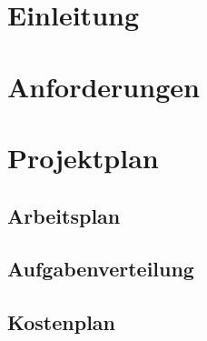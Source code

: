 \documentclass[12pt,			%
a4paper,						%
twoside, 						%
listof=totoc, 					%
bibliography=totoc,				%
titlepage, 						%
headsepline, 					%
DIV18,							%
BCOR6mm,						%
cleardoublepage=empty,			%
parskip,						%
ngerman							%
]{scrbook}
\begin{document}
\setcounter{secnumdepth}{3}				%
\setcounter{tocdepth}{3}
\sffamily								%





\tableofcontents						%
\cleardoublepage


\rmfamily

\chapter{Einleitung}
\setcounter{chapter}{1}


\chapter{Anforderungen}
\setcounter{chapter}{2}


\chapter{Projektplan}

\section{Arbeitsplan}

\section{Aufgabenverteilung}

\section{Kostenplan}

\end{document}
